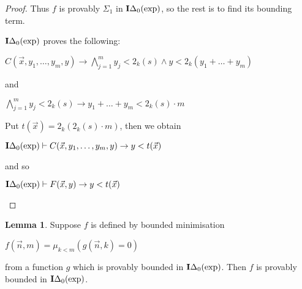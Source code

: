 \documentclass[8pt]{article}
\theoremstyle{definition}
\theoremstyle{definition}
\theoremstyle{definition}
\theoremstyle{definition}
\theoremstyle{definition}
\theoremstyle{definition}
\theoremstyle{definition}
\theoremstyle{definition}
\newtheorem{lemma}{Lemma}[section]
\theoremstyle{definition}
\theoremstyle{definition}
\theoremstyle{definition}
\theoremstyle{definition}
\theoremstyle{definition}
\theoremstyle{question}
\begin{document}
\begin{proof}
  Thus $f$ is provably $\Sigma_1$ in ${\bf I}\Delta_0(\operatorname{exp})$, so the rest is to find its bounding term.

  ${\bf I}\Delta_0(\operatorname{exp})$ proves the following:

  \begin{center}
    $C(\vec{x}, y_1, \dots, y_m, y) \to \bigwedge \limits_{j = 1}^m y_j < 2_k(s) \land y < 2_k(y_1 + \dots + y_m)$
  \end{center}

  and

  \begin{center}
    $\bigwedge \limits_{j = 1}^m y_j < 2_k(s) \to y_1 + \dots + y_m < 2_k(s) \cdot m$
  \end{center}

  Put $t(\vec{x}) = 2_k(2_k(s) \cdot m)$, then we obtain

  \begin{center}
    ${\bf I}\Delta_0(\operatorname{exp}) \vdash C(\vec{x}, y_1, \dots, y_m, y) \to y < t(\vec{x})$
  \end{center}

  and so

  \begin{center}
    ${\bf I}\Delta_0(\operatorname{exp}) \vdash F(\vec{x}, y) \to y < t(\vec{x})$
  \end{center}
\end{proof}

\begin{lemma}
  Suppose $f$ is defined by bounded minimisation
  \begin{center}
    $f(\vec{n}, m) = \mu_{k < m} (g(\vec{n}, k) = 0)$
  \end{center}
  from a function $g$ which is provably bounded in ${\bf I}\Delta_0(\operatorname{exp})$.
  Then $f$ is provably bounded in ${\bf I}\Delta_0(\operatorname{exp})$.
\end{lemma}
\end{document}
